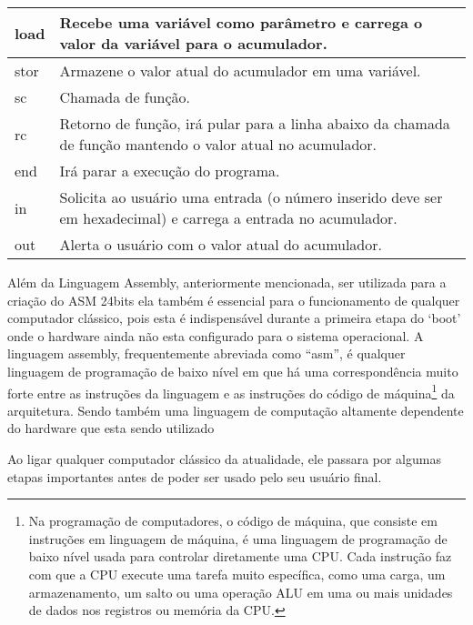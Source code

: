\begin{longtable}{ |p{3cm}||p{11cm}|  }
  load &
  Recebe uma variável como parâmetro e carrega o valor da variável para o acumulador. \\
  \hline
  stor &
  Armazene o valor atual do acumulador em uma variável. \\
  \hline
  sc &
  Chamada de função. \\
  \hline
  rc &
  Retorno de função, irá pular para a linha abaixo da chamada de função mantendo o valor atual no acumulador. \\
  \hline
  end &
  Irá parar a execução do programa. \\
  \hline
  in &
  Solicita ao usuário uma entrada (o número inserido deve ser em hexadecimal) e carrega a entrada no acumulador. \\
  \hline
  out &
  Alerta o usuário com o valor atual do acumulador. \\
  \hline
\end{longtable}
\vspace{1cm}

Além da Linguagem Assembly, anteriormente mencionada, ser utilizada para a criação do ASM 24bits ela também é essencial para o funcionamento de qualquer computador clássico, pois esta é indispensável durante a primeira etapa do `boot' onde o hardware ainda não esta configurado para o sistema operacional. A linguagem assembly, frequentemente abreviada como ``asm'', é qualquer linguagem de programação de baixo nível em que há uma correspondência muito forte entre as instruções da linguagem e as instruções do código de máquina\footnote{Na programação de computadores, o código de máquina, que consiste em instruções em linguagem de máquina, é uma linguagem de programação de baixo nível usada para controlar diretamente uma CPU. Cada instrução faz com que a CPU execute uma tarefa muito específica, como uma carga, um armazenamento, um salto ou uma operação ALU em uma ou mais unidades de dados nos registros ou memória da CPU.} da arquitetura. Sendo também uma linguagem de computação altamente dependente do hardware que esta sendo utilizado

Ao ligar qualquer computador clássico da atualidade, ele passara por algumas etapas importantes antes de poder ser usado pelo seu usuário final. 

